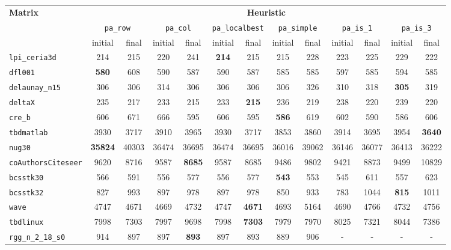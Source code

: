 \begin{table}
		\centering
	\begin{tabular}{|l|c|c||c|c||c|c||c|c||c|c||c|c|}
		\hline
		\multirow{3}{*}{\textbf{Matrix}} & \multicolumn{12}{c|}{\textbf{Heuristic}} \\ \cline{2-13}
		& \multicolumn{2}{c||}{\texttt{pa\_row}} &  \multicolumn{2}{c||}{\texttt{pa\_col}} & \multicolumn{2}{c||}{\texttt{pa\_localbest}} & \multicolumn{2}{c||}{\texttt{pa\_simple}} & \multicolumn{2}{c||}{\texttt{pa\_is\_1}} & \multicolumn{2}{c|}{\texttt{pa\_is\_3}} \\\cline{2-13}
		& initial & final & initial & final & initial & final & initial & final & initial & final & initial & final \\ \hline
		\verb|lpi_ceria3d| &  214 & 215 & 220 & 241 & \textbf{214} & 215 & 215 & 228 & 223 & 225 & 229 & 222 \\  
		\verb|dfl001| &  \textbf{580} & 608 & 590 & 587 & 590 & 587 & 585 & 585 & 597 & 585 & 594 & 585 \\
		\verb|delaunay_n15| &  306 & 306 & 314 & 306 & 306 & 306 & 306 & 326 & 310 & 318 & \textbf{305} & 319 \\
		\verb|deltaX| &  235 & 217 & 233 & 215 & 233 & \textbf{215} & 236 & 219 & 238 & 220 & 239 & 220 \\
		\verb|cre_b| &  606 & 671 & 666 & 595 & 606 & 595 & \textbf{586} & 619 & 602 & 590 & 586 & 606\\
		\verb|tbdmatlab| & 3930 & 3717 & 3910 & 3965 & 3930 & 3717 & 3853 & 3860 & 3914 & 3695 & 3954 & \textbf{3640} \\
		\verb|nug30| &  \textbf{35824} & 40303 & 36474 & 36695 & 36474 & 36695 & 36016 & 39062 & 36146 & 36077 & 36413 & 36222 \\
		\verb|coAuthorsCiteseer| &  9620 & 8716 & 9587 & \textbf{8685} & 9587 & 8685 & 9486 & 9802 & 9421 & 8873 & 9499 & 10829 \\
		\verb|bcsstk30| &  566 & 591 & 556 & 577 & 556 & 577 & \textbf{543} & 553 & 545 & 611 & 557 & 623 \\
		\verb|bcsstk32| &  827 & 993 & 897 & 978 & 897 & 978 & 850 & 933 & 783 & 1044 & \textbf{815} & 1011\\
		\verb|wave| &  4747 & 4671 & 4669 & 4732 & 4747 & \textbf{4671} & 4693 & 5164 & 4690 & 4766 & 4732 & 4756 \\
		\verb|tbdlinux| &  7998 & 7303 & 7997 & 9698 & 7998 & \textbf{7303} & 7979 & 7970 & 8025 & 7321 & 8044 & 7386 \\
		\verb|rgg_n_2_18_s0| &  914 & 897 & 897 & \textbf{893} & 897 & 893 & 889 & 906 & - & - & - & -\\

\end{tabular}
\end{table}
